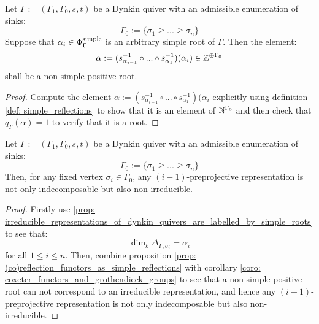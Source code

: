             \begin{lemma} \label{lemma: non_simple_positive_roots_from_simple_roots_via_simple_reflections}
                Let $\Gamma := (\Gamma_1, \Gamma_0, s, t)$ be a Dynkin quiver with an admissible enumeration of sinks:
                    $$\Gamma_0 := \{\sigma_1 \geq ... \geq \sigma_n\}$$
                Suppose that $\alpha_i \in \Phi_{\Gamma}^{\mathrm{simple}}$ is an arbitrary simple root of $\Gamma$. Then the element:
                    $$\alpha := (s_{\alpha_{i - 1}}^{-1} \circ ... \circ s_{\alpha_1}^{-1})(\alpha_i) \in \mathbb{Z}^{\oplus \Gamma_0}$$
                shall be a non-simple positive root. 
            \end{lemma}    
                \begin{proof}
                    Compute the element $\alpha := (s_{\alpha_{i - 1}}^{-1} \circ ... \circ s_{\alpha_1}^{-1})(\alpha_i$ explicitly using definition \ref{def: simple_reflections} to show that it is an element of $\mathbb{N}^{\Gamma_0}$ and then check that $q_{\Gamma}(\alpha) = 1$ to verify that it is a root. 
                \end{proof}
            \begin{corollary} \label{coro: preprojective_representations_of_dynkin_quivers_are_indecomposable}
                Let $\Gamma := (\Gamma_1, \Gamma_0, s, t)$ be a Dynkin quiver with an admissible enumeration of sinks:
                    $$\Gamma_0 := \{\sigma_1 \geq ... \geq \sigma_n\}$$
                Then, for any fixed vertex $\sigma_i \in \Gamma_0$, any $(i - 1)$-preprojective representation is not only indecomposable but also non-irreducible. 
            \end{corollary}
                \begin{proof}
                    Firstly use \ref{prop: irreducible_representations_of_dynkin_quivers_are_labelled_by_simple_roots} to see that:
                        $$\dim_k \Delta_{\Gamma, \sigma_i} = \alpha_i$$
                    for all $1 \leq i \leq n$. Then, combine proposition \ref{prop: (co)reflection_functors_as_simple_reflections} with corollary \ref{coro: coxeter_functors_and_grothendieck_groups} to see that a non-simple positive root can not correspond to an irreducible representation, and hence any $(i - 1)$-preprojective representation is not only indecomposable but also non-irreducible. 
                \end{proof}
